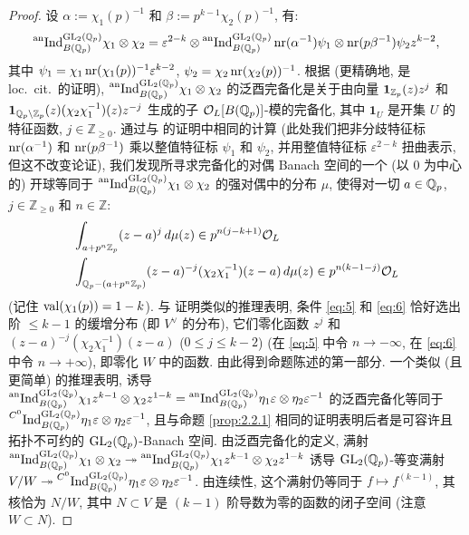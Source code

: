 \begin{proof}
设 $\alpha := \chi_1(p)^{-1}$ 和 $\beta := p^{k-1}\chi_2(p)^{-1}$, 有:
\[
\prescript{\mathrm{an}}{}{\mathrm{Ind}}_{B(\mathbb{Q}_p)}^{\mathrm{GL}_2(\mathbb{Q}_p)} \chi_1 \otimes \chi_2
= \varepsilon^{2-k} \otimes \prescript{\mathrm{an}}{}{\mathrm{Ind}}_{B(\mathbb{Q}_p)}^{\mathrm{GL}_2(\mathbb{Q}_p)} \operatorname{nr}(\alpha^{-1})\psi_1 \otimes \operatorname{nr}(p\beta^{-1})\psi_2 z^{k-2},
\]
其中 $\psi_1 = \chi_1\operatorname{nr}(\chi_1(p))^{-1}\varepsilon^{k-2}$, $\psi_2 = \chi_2\operatorname{nr}(\chi_2(p))^{-1}$.
根据 \cite[Prop.~1.21]{ref:21} (更精确地, 是 loc.\ cit.\ 的证明), $\prescript{\mathrm{an}}{}{\mathrm{Ind}}_{B(\mathbb{Q}_p)}^{\mathrm{GL}_2(\mathbb{Q}_p)} \chi_1 \otimes \chi_2$ 的泛酉完备化是关于由向量 $\mathbf{1}_{\mathbb{Z}_p}(z)z^{j}$ 和 $\mathbf{1}_{\mathbb{Q}_p \setminus \mathbb{Z}_p}(z)(\chi_2\chi_1^{-1})(z)z^{-j}$ 生成的子 $\mathcal{O}_L[B(\mathbb{Q}_p)]$-模的完备化, 其中 $\mathbf{1}_{U}$ 是开集 $U$ 的特征函数, $j \in \mathbb{Z}_{\ge 0}$.
通过与 \cite[Th.~4.3.1]{ref:3} 的证明中相同的计算 (此处我们把非分歧特征标 $\operatorname{nr}(\alpha^{-1})$ 和 $\operatorname{nr}(p\beta^{-1})$ 乘以整值特征标 $\psi_1$ 和 $\psi_2$, 并用整值特征标 $\varepsilon^{2-k}$ 扭曲表示, 但这不改变论证), 我们发现所寻求完备化的对偶 Banach 空间的一个 (以 $0$ 为中心的) 开球等同于 $\prescript{\mathrm{an}}{}{\mathrm{Ind}}_{B(\mathbb{Q}_p)}^{\mathrm{GL}_2(\mathbb{Q}_p)} \chi_1 \otimes \chi_2$ 的强对偶中的分布 $\mu$, 使得对一切 $a \in \mathbb{Q}_p$, $j \in \mathbb{Z}_{\ge 0}$ 和 $n \in \mathbb{Z}$:
\begin{align}
\label{eq:5}
&\int_{a+p^{n}\mathbb{Z}_p} (z-a)^{j}\,d\mu(z) \in p^{n(j-k+1)}\mathcal{O}_L\\
\label{eq:6}
&\int_{\mathbb{Q}_p - (a+p^{n}\mathbb{Z}_p)} (z-a)^{-j}(\chi_2\chi_1^{-1})(z-a)\,d\mu(z) \in p^{n(k-1-j)}\mathcal{O}_L
\end{align}
(记住 $\operatorname{val}(\chi_1(p)) = 1-k$).
与 \cite[Th.~4.3.1]{ref:3} 证明类似的推理表明, 条件 \eqref{eq:5} 和 \eqref{eq:6} 恰好选出阶 $\le k-1$ 的缓增分布 (即 $V^{\vee}$ 的分布), 它们零化函数 $z^{j}$ 和 $(z-a)^{-j}(\chi_2\chi_1^{-1})(z-a)$ ($0 \le j \le k-2$) (在 \eqref{eq:5} 中令 $n \to -\infty$, 在 \eqref{eq:6} 中令 $n \to +\infty$), 即零化 $W$ 中的函数.
由此得到命题陈述的第一部分.
一个类似 (且更简单) 的推理表明, 诱导 $\prescript{\mathrm{an}}{}{\mathrm{Ind}}_{B(\mathbb{Q}_p)}^{\mathrm{GL}_2(\mathbb{Q}_p)} \chi_1 z^{k-1} \otimes \chi_2 z^{1-k} = \prescript{\mathrm{an}}{}{\mathrm{Ind}}_{B(\mathbb{Q}_p)}^{\mathrm{GL}_2(\mathbb{Q}_p)} \eta_1\varepsilon \otimes \eta_2\varepsilon^{-1}$ 的泛酉完备化等同于 $\prescript{C^{0}}{}{\mathrm{Ind}}_{B(\mathbb{Q}_p)}^{\mathrm{GL}_2(\mathbb{Q}_p)} \eta_1\varepsilon \otimes \eta_2\varepsilon^{-1}$, 且与命题 \ref{prop:2.2.1} 相同的证明表明后者是可容许且拓扑不可约的 $\mathrm{GL}_2(\mathbb{Q}_p)$-Banach 空间.
由泛酉完备化的定义, 满射 $\prescript{\mathrm{an}}{}{\mathrm{Ind}}_{B(\mathbb{Q}_p)}^{\mathrm{GL}_2(\mathbb{Q}_p)} \chi_1 \otimes \chi_2 \twoheadrightarrow \prescript{\mathrm{an}}{}{\mathrm{Ind}}_{B(\mathbb{Q}_p)}^{\mathrm{GL}_2(\mathbb{Q}_p)} \chi_1 z^{k-1} \otimes \chi_2 z^{1-k}$ 诱导 $\mathrm{GL}_2(\mathbb{Q}_p)$-等变满射 $V/W \twoheadrightarrow \prescript{C^{0}}{}{\mathrm{Ind}}_{B(\mathbb{Q}_p)}^{\mathrm{GL}_2(\mathbb{Q}_p)} \eta_1\varepsilon \otimes \eta_2\varepsilon^{-1}$.
由连续性, 这个满射仍等同于 $f \mapsto f^{(k-1)}$, 其核恰为 $N/W$, 其中 $N \subset V$ 是 $(k-1)$ 阶导数为零的函数的闭子空间 (注意 $W \subset N$).

\end{proof}
